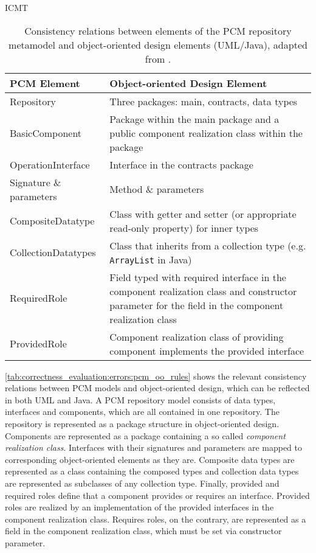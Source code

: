 \begin{copiedFrom}{ICMT}
\begin{table}
	\centering 
    \small
    \renewcommand{\arraystretch}{1.4}
	\begin{tabular}{p{3.2cm} p{6.6cm}}
		\toprule
        \textbf{\gls{PCM} Element}  & \textbf{Object-oriented Design Element} \\
        \midrule
		Repository              & Three packages: main, contracts, data types\\
		BasicComponent 		    & Package within the main package and a public component realization class within the package \\
		OperationInterface		& Interface in the contracts package \\
		Signature \& parameters & Method \& parameters \\
		CompositeDatatype       & Class with getter and setter (or appropriate read-only property) for inner types\\
		CollectionDatatypes     & Class that inherits from a collection type (e.g. \texttt{ArrayList} in Java) \\
		RequiredRole		    & Field typed with required interface in the component realization class and constructor parameter for the field in the component realization class\\
		ProvidedRole		    & Component realization class of providing component implements the provided interface\\
		\bottomrule
	\end{tabular}
	\caption[Consistency relations between PCM and UML/Java]{Consistency relations between elements of the \gls{PCM} repository metamodel and object-oriented design elements (\gls{UML}/Java), adapted from \cite[Table 4.1]{langhammer2017a}.}
	\label{tab:correctness_evaluation:errors:pcm_oo_rules}
\end{table}

\autoref{tab:correctness_evaluation:errors:pcm_oo_rules} shows the relevant consistency relations between \gls{PCM} models and object-oriented design, which can be reflected in both \gls{UML} and Java.
A \gls{PCM} repository model consists of data types, interfaces and components, which are all contained in one repository.
The repository is represented as a package structure in object-oriented design.
Components are represented as a package containing a so called \emph{component realization class}.
Interfaces with their signatures and parameters are mapped to corresponding object-oriented elements as they are.
Composite data types are represented as a class containing the composed types and collection data types are represented as subclasses of any collection type.
Finally, provided and required roles define that a component provides or requires an interface.
Provided roles are realized by an implementation of the provided interfaces in the component realization class.
Requires roles, on the contrary, are represented as a field in the component realization class, which must be set via constructor parameter.


\end{copiedFrom}
